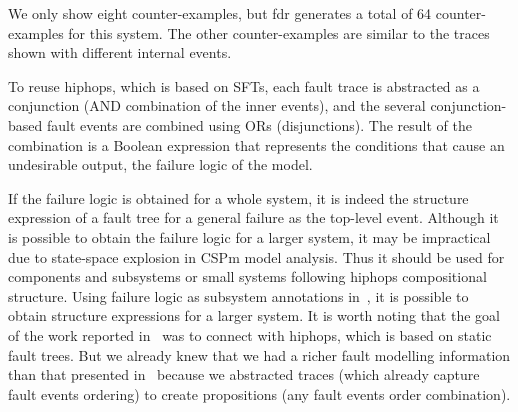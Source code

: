 \documentclass[en,twoside,onehalfspacing,phd]{risethesis}
\begin{document}
We only show eight counter-examples, but \acs{fdr} generates a total of 64 counter-examples for this system.
The other counter-examples are similar to the traces shown with different internal events.

To reuse \ac{hiphops}, which is based on \acp{SFT}, each fault trace is abstracted as a conjunction (AND combination of the inner events), and the several conjunction-based fault events are combined using ORs (disjunctions).
%
The result of the combination is a Boolean expression that represents the conditions that cause an undesirable output, the failure logic of the model.

If the failure logic is obtained for a whole system, it is indeed the structure expression of a fault tree for a general failure as the top-level event.
Although it is possible to obtain the failure logic for a larger system, it may be impractical due to state-space explosion in \ac{CSPm} model analysis.
Thus it should be used for components and subsystems or small systems following \ac{hiphops} compositional structure.
%
Using failure logic as subsystem annotations in~\cite{PMS+2001}, it is possible to obtain structure expressions for a larger system.
It is worth noting that the goal of the work reported in~\cite{DM2012} was to connect with \ac{hiphops}, which is based on static fault trees.
But we already knew that we had a richer fault modelling information than that presented in~\cite{DM2012} because we abstracted traces (which already capture fault events ordering) to create propositions (any fault events order combination).

\end{document}
